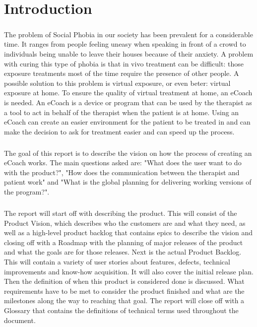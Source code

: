 \chapter{Introduction}

\paragraph{}
The problem of Social Phobia in our society has been prevalent for a considerable time. It ranges from people feeling uneasy when speaking in front of a crowd to individuals being unable to leave their houses because of their anxiety. 
A problem with curing this type of phobia is that in vivo treatment can be difficult: those exposure treatments most of the time require the presence of other people. A possible solution to this problem is virtual exposure, or even beter: virtual exposure at home. To ensure the quality of virtual treatment at home, an \gls{eCoach} is needed. An \gls{eCoach} is a device or program that can be used by the therapist as a tool to act in behalf of the therapist when the patient is at home. Using an \gls{eCoach} can create an easier environment for the patient to be treated in and can make the decision to ask for treatment easier and can speed up the process.
\paragraph{}
The goal of this report is to describe the vision on how the process of creating an \gls{eCoach} works. The main questions asked are: "What does the user want to do with the product?", "How does the communication between the therapist and patient work" and "What is the global planning for delivering working versions of the program?".
\paragraph{}
The report will start off with describing the product. This will consist of the Product Vision, which describes who the customers are and what they need, as well as a high-level product backlog that contains epics to describe the vision and closing off with a Roadmap with the planning of major releases of the product and what the goals are for those releases.
Next is the actual Product Backlog. This will contain a variety of user stories about features, defects, technical improvements and know-how acquisition. It will also cover the initial release plan.
Then the definition of when this product is considered done is discussed. What requirements have to be met to consider the product finished and what are the milestones along the way to reaching that goal.
The report will close off with a Glossary that contains the definitions of technical terms used throughout the document.
